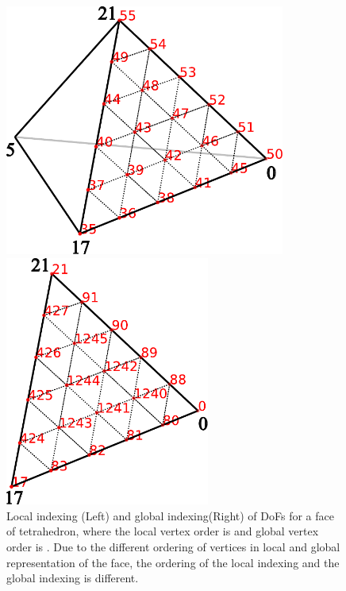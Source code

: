 \documentclass[mathpazo]{cicp}
\begin{document}
\begin{figure}[htp]
  \begin{minipage}[t]{0.48\textwidth}
  \centering
  \includegraphics[width=0.82\textwidth]{figures/assigndof_ex_cell.pdf}
  \end{minipage}
  \begin{minipage}[t]{0.48\textwidth}
  \centering
  \includegraphics[width=0.6\textwidth]{figures/assigndof_ex_face.pdf}
  \end{minipage}
  \caption{Local indexing (Left) and global indexing(Right) of DoFs for a face
  of tetrahedron, where the local vertex order is \mc{[17, 0,
  21]} and global vertex order is \mc{[0, 17, 21]}. Due to the different ordering of vertices in local and global representation of the face, the ordering of the local indexing and the global indexing is different.}
  \label{fig:assigndofex}
\end{figure}
\end{document}

